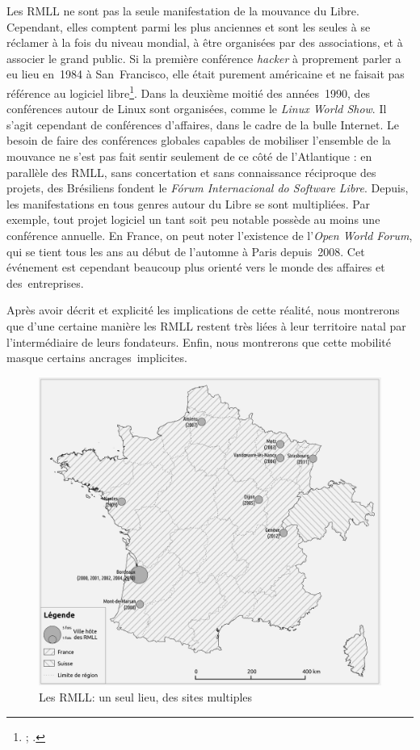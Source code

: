 \documentclass{FramateX}
\begin{document}
\begin{refsection}
Les RMLL ne sont pas la seule manifestation de la mouvance du Libre.
Cependant, elles comptent parmi les plus anciennes et sont les seules à
se réclamer à la fois du niveau mondial, à être organisées par des
associations, et à associer le grand public. Si la première conférence
\textit{hacker} à proprement parler a eu lieu en~1984 à San~Francisco,
elle était purement américaine et ne faisait pas référence au logiciel
libre\footnote{\cite{Turner2006}; \cite{colemanhacker2010}.}. Dans la deuxième moitié des années~1990,
des conférences autour de Linux sont organisées, comme le \textit{Linux
World Show}. Il s'agit cependant de conférences d'affaires, dans le
cadre de la bulle Internet. Le besoin de faire des conférences globales
capables de mobiliser l'ensemble de la mouvance ne s'est pas fait
sentir seulement de ce côté de l'Atlantique : en parallèle des RMLL,
sans concertation et sans connaissance réciproque des projets, des
Brésiliens fondent le \textit{Fórum Internacional do
Software Libre}. Depuis, les manifestations en tous genres autour du
Libre se sont multipliées. Par exemple, tout projet logiciel un tant
soit peu notable possède au moins une conférence annuelle. En France,
on peut noter l'existence de l'\textit{Open World Forum}, qui se tient
tous les ans au début de l'automne à Paris depuis~2008. Cet événement
est cependant beaucoup plus orienté vers le monde des affaires et
des~entreprises.

Après avoir décrit et explicité les implications de cette réalité, nous
montrerons que d'une certaine manière les RMLL restent très liées à
leur territoire natal par l'intermédiaire de leurs fondateurs. Enfin,
nous montrerons que cette mobilité masque certains ancrages~implicites.

\begin{figure}
\centering
\includegraphics[scale=0.3]{images/images_PAGiraud/carte_rmll_revue.png}
\caption{Les RMLL: un seul lieu, des sites multiples}
\end{figure}




\end{refsection}
\end{document}
